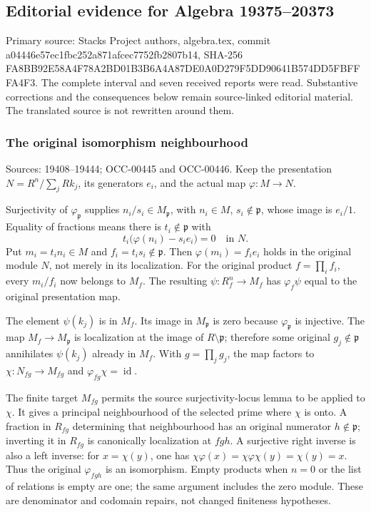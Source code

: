 \subsection{Editorial evidence for Algebra 19375--20373}\label{editorial-evidence-for-algebra-1937520373}

Primary source: Stacks Project authors, algebra.tex, commit a04446e57ec1fbc252a871afcec7752fb2807b14, SHA-256 FA8BB92E58A4F78A2BD01B3B6A4A87DE0A0D279F5DD90641B574DD5FBFFFA4F3. The complete interval and seven received reports were read. Substantive corrections and the consequences below remain source-linked editorial material. The translated source is not rewritten around them.

\subsubsection{The original isomorphism neighbourhood}\label{the-original-isomorphism-neighbourhood}

Sources: 19408--19444; OCC-00445 and OCC-00446. Keep the presentation \(N=R^n/\sum_jRk_j\), its generators \(e_i\), and the actual map \(\varphi:M\to N\).

Surjectivity of \(\varphi_{\mathfrak p}\) supplies \(n_i/s_i\in M_{\mathfrak p}\), with \(n_i\in M\), \(s_i\notin\mathfrak p\), whose image is \(e_i/1\). Equality of fractions means there is \(t_i\notin\mathfrak p\) with \[
t_i\bigl(\varphi(n_i)-s_ie_i\bigr)=0\quad\text{in }N.
\] Put \(m_i=t_in_i\in M\) and \(f_i=t_is_i\notin\mathfrak p\). Then \(\varphi(m_i)=f_ie_i\) holds in the original module \(N\), not merely in its localization. For the original product \(f=\prod_i f_i\), every \(m_i/f_i\) now belongs to \(M_f\). The resulting \(\psi:R_f^n\to M_f\) has \(\varphi_f\psi\) equal to the original presentation map.

The element \(\psi(k_j)\) is in \(M_f\). Its image in \(M_{\mathfrak p}\) is zero because \(\varphi_{\mathfrak p}\) is injective. The map \(M_f\to M_{\mathfrak p}\) is localization at the image of \(R\setminus\mathfrak p\); therefore some original \(g_j\notin\mathfrak p\) annihilates \(\psi(k_j)\) already in \(M_f\). With \(g=\prod_jg_j\), the map factors to \(\chi:N_{fg}\to M_{fg}\) and \(\varphi_{fg}\chi=\operatorname{id}\).

The finite target \(M_{fg}\) permits the source surjectivity-locus lemma to be applied to \(\chi\). It gives a principal neighbourhood of the selected prime where \(\chi\) is onto. A fraction in \(R_{fg}\) determining that neighbourhood has an original numerator \(h\notin\mathfrak p\); inverting it in \(R_{fg}\) is canonically localization at \(fgh\). A surjective right inverse is also a left inverse: for \(x=\chi(y)\), one has \(\chi\varphi(x)=\chi\varphi\chi(y)=\chi(y)=x\). Thus the original \(\varphi_{fgh}\) is an isomorphism. Empty products when \(n=0\) or the list of relations is empty are one; the same argument includes the zero module. These are denominator and codomain repairs, not changed finiteness hypotheses.

